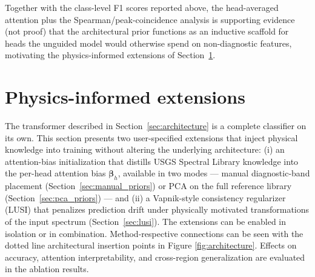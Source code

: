 \documentclass[preprint,12pt]{elsarticle}
\begin{document}
Together with the class-level F1 scores reported above, the head-averaged attention plus the Spearman/peak-coincidence analysis is supporting evidence (not proof) that the architectural prior functions as an inductive scaffold for heads the unguided model would otherwise spend on non-diagnostic features, motivating the physics-informed extensions of Section~\ref{sec:phys_extensions}.


\section{Physics-informed extensions}
\label{sec:phys_extensions}

The transformer described in Section~\ref{sec:architecture} is a complete classifier on its own.
This section presents two user-specified extensions that inject physical knowledge into training without altering the underlying architecture: (i) an attention-bias initialization that distills USGS Spectral Library knowledge into the per-head attention bias $\bm{\beta}_h$, available in two modes --- manual diagnostic-band placement (Section~\ref{sec:manual_priors}) or PCA on the full reference library (Section~\ref{sec:pca_priors}) --- and (ii) a Vapnik-style consistency regularizer (LUSI) that penalizes prediction drift under physically motivated transformations of the input spectrum (Section~\ref{sec:lusi}).
The extensions can be enabled in isolation or in combination.
Method-respective connections can be seen with the dotted line architectural insertion points in Figure \ref{fig:architecture}.
Effects on accuracy, attention interpretability, and cross-region generalization are evaluated in the ablation results.
\end{document}
